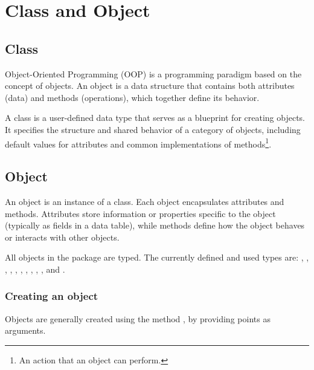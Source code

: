 \newpage

\section{Class and Object} %
\label{sec:class_and_object}

\subsection{Class} %
\label{sub:class}

Object-Oriented Programming (OOP) is a programming paradigm based on the concept of objects. An object is a data structure that contains both attributes (data) and methods (operations), which together define its behavior.

\vspace{1em}
A class is a user-defined data type that serves as a blueprint for creating objects. It specifies the structure and shared behavior of a category of objects, including default values for attributes and common implementations of methods\footnote{An action that an object can perform.}.

\subsection{Object} %
\label{sub:object}

An object is an instance of a class. Each object encapsulates attributes and methods. Attributes store information or properties specific to the object (typically as fields in a data table), while methods define how the object behaves or interacts with other objects.

 
\vspace{1em}
 All objects in the package are typed. The currently defined and used types are: , , , , , , , , ,  ,  and . 

\subsubsection{Creating an object} %
\label{ssub:creating_an_object}

Objects are generally created using the method , by providing points as arguments.

